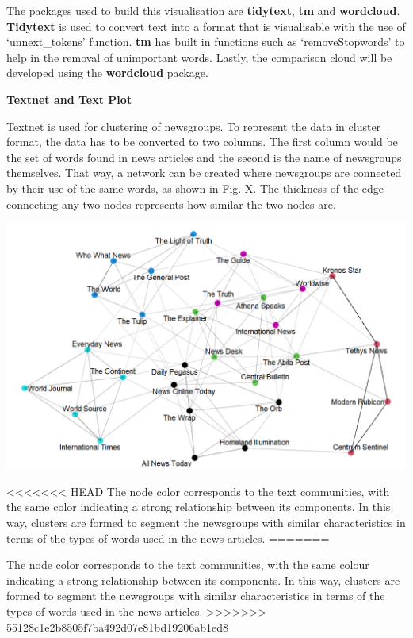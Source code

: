\documentclass{acm_proc_article-sp}
\begin{document}
The packages used to build this visualisation are \textbf{tidytext},
\textbf{tm} and \textbf{wordcloud}. \textbf{Tidytext} is used to convert
text into a format that is visualisable with the use of `unnext\_tokens'
function. \textbf{tm} has built in functions such as `removeStopwords'
to help in the removal of unimportant words. Lastly, the comparison
cloud will be developed using the \textbf{wordcloud} package.

\textbf{Textnet and Text Plot}

Textnet is used for clustering of newsgroups. To represent the data in
cluster format, the data has to be converted to two columns. The first
column would be the set of words found in news articles and the second
is the name of newsgroups themselves. That way, a network can be created
where newsgroups are connected by their use of the same words, as shown
in Fig. X. The thickness of the edge connecting any two nodes represents
how similar the two nodes are.

\includegraphics{img/image02.png}

\textless\textless\textless\textless\textless\textless\textless{} HEAD
The node color corresponds to the text communities, with the same color
indicating a strong relationship between its components. In this way,
clusters are formed to segment the newsgroups with similar
characteristics in terms of the types of words used in the news
articles. =======

The node color corresponds to the text communities, with the same colour
indicating a strong relationship between its components. In this way,
clusters are formed to segment the newsgroups with similar
characteristics in terms of the types of words used in the news
articles.
\textgreater\textgreater\textgreater\textgreater\textgreater\textgreater\textgreater{}
55128c1e2b8505f7ba492d07e81bd19206ab1ed8
\end{document}
